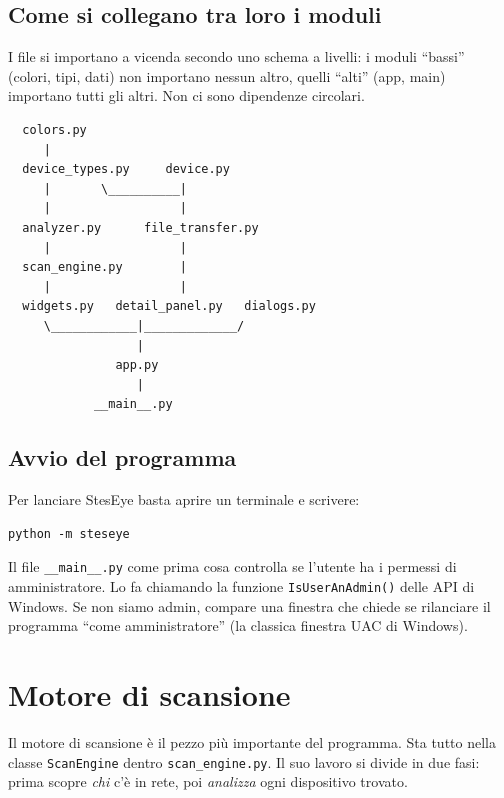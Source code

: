 \documentclass[a4paper,11pt]{article}
\begin{document}
\subsection{Come si collegano tra loro i moduli}

I file si importano a vicenda secondo uno schema a livelli:
i moduli ``bassi'' (colori, tipi, dati) non importano nessun
altro, quelli ``alti'' (app, main) importano tutti gli altri.
Non ci sono dipendenze circolari.

\begin{center}
\small
\begin{verbatim}
  colors.py
     |
  device_types.py     device.py
     |       \__________|
     |                  |
  analyzer.py      file_transfer.py
     |                  |
  scan_engine.py        |
     |                  |
  widgets.py   detail_panel.py   dialogs.py
     \____________|_____________/
                  |
               app.py
                  |
            __main__.py
\end{verbatim}
\end{center}

\subsection{Avvio del programma}

Per lanciare StesEye basta aprire un terminale e scrivere:

\begin{lstlisting}[numbers=none]
python -m steseye
\end{lstlisting}

Il file \texttt{\_\_main\_\_.py} come prima cosa controlla se
l'utente ha i permessi di amministratore.  Lo fa chiamando la
funzione \texttt{IsUserAnAdmin()} delle API di Windows.
Se non siamo admin, compare una finestra che chiede se rilanciare
il programma ``come amministratore'' (la classica finestra UAC
di Windows).


\section{Motore di scansione}

Il motore di scansione è il pezzo più importante del programma.
Sta tutto nella classe \texttt{ScanEngine} dentro
\texttt{scan\_engine.py}.  Il suo lavoro si divide in due fasi:
prima scopre \emph{chi} c'è in rete, poi \emph{analizza} ogni
dispositivo trovato.
\end{document}
